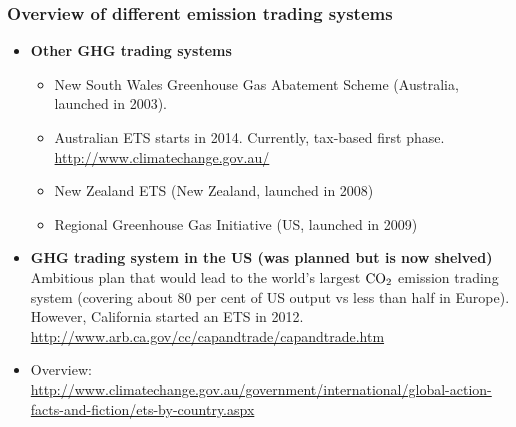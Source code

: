 	
  \begin{frame}
  \frametitle{Overview of different emission trading systems}
  \begin{itemize}

  \item<1-> \textbf{Other GHG trading systems}
        \begin{itemize}
        \item New South Wales Greenhouse Gas Abatement Scheme (Australia, launched in 2003).
        \item Australian ETS starts in 2014. Currently, tax-based first phase.
        \url{http://www.climatechange.gov.au/}
        \item New Zealand ETS (New Zealand, launched in 2008)
        \item Regional Greenhouse Gas Initiative (US, launched in 2009)
        \end{itemize}
   \item<2-> \textbf{GHG trading system in the US (was planned but is now shelved)} \\
   Ambitious plan that would lead to the world's largest $\textnormal{CO}_2$ emission trading system (covering about 80 per cent of US output vs less than half in Europe). However,
   California started an ETS in 2012. \url{http://www.arb.ca.gov/cc/capandtrade/capandtrade.htm}
   \item<3-> Overview: \url{http://www.climatechange.gov.au/government/international/global-action-facts-and-fiction/ets-by-country.aspx}
   \end{itemize}
\end{frame}

